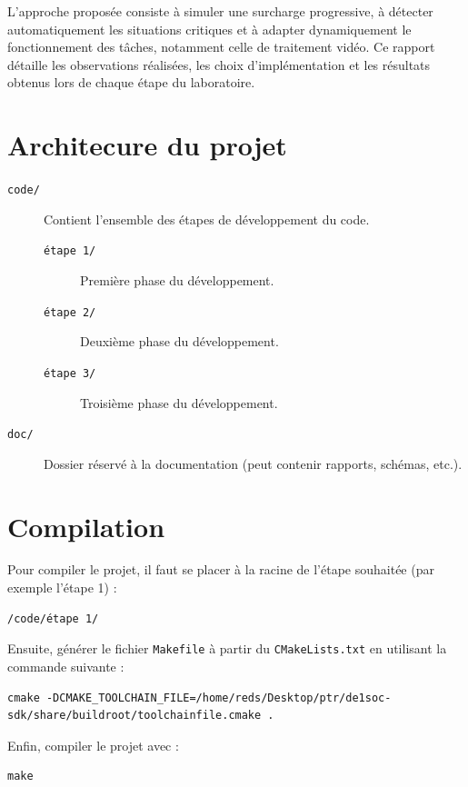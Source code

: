 \documentclass[a4paper,12pt]{article}
\begin{document}
L'approche proposée consiste à simuler une surcharge progressive, à détecter automatiquement les situations critiques et à adapter dynamiquement le fonctionnement des tâches, notamment celle de traitement vidéo. Ce rapport détaille les observations réalisées, les choix d'implémentation et les résultats obtenus lors de chaque étape du laboratoire.

\section{Architecure du projet}

\begin{description}
  \item[\texttt{code/}] Contient l’ensemble des étapes de développement du code.
  \begin{description}
    \item[\texttt{étape 1/}] Première phase du développement.
    \item[\texttt{étape 2/}] Deuxième phase du développement.
    \item[\texttt{étape 3/}] Troisième phase du développement.
  \end{description}
  \item[\texttt{doc/}] Dossier réservé à la documentation (peut contenir rapports, schémas, etc.).
\end{description}

\section{Compilation}

Pour compiler le projet, il faut se placer à la racine de l’étape souhaitée (par exemple l’étape 1) :

\begin{verbatim}
/code/étape 1/
\end{verbatim}

Ensuite, générer le fichier \texttt{Makefile} à partir du \texttt{CMakeLists.txt} en utilisant la commande suivante :

\begin{verbatim}
cmake -DCMAKE_TOOLCHAIN_FILE=/home/reds/Desktop/ptr/de1soc-sdk/share/buildroot/toolchainfile.cmake .
\end{verbatim}

Enfin, compiler le projet avec :

\begin{verbatim}
make
\end{verbatim}
\end{document}
